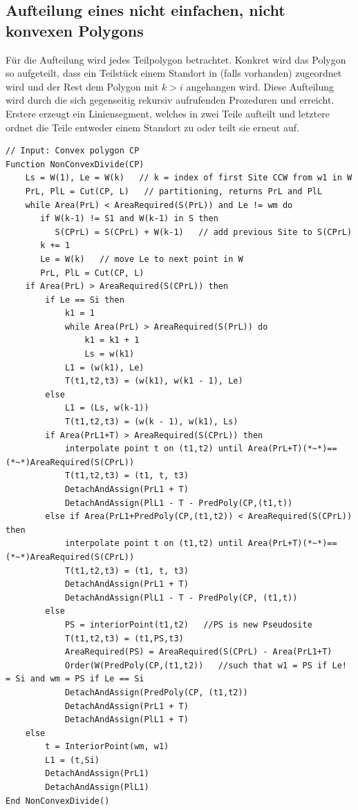 \documentclass[ngerman]{seminarbeitrag}
\begin{document}
\subsection{Aufteilung eines nicht einfachen, nicht konvexen Polygons}\label{aufteilung nicht konvex}
Für die Aufteilung wird jedes Teilpolygon \cpp betrachtet. Konkret wird das Polygon \pred{\mcpi}so aufgeteilt, dass ein Teilstück einem Standort in \cpi (falls vorhanden) zugeordnet wird und der Rest dem Polygon mit $k > i$ angehangen wird. Diese Aufteilung wird durch die sich gegenseitig rekursiv aufrufenden Prozeduren \noncon und \daa erreicht. Erstere erzeugt ein Liniensegment, welches \pred{\mcpi}in zwei Teile aufteilt und letztere ordnet die Teile entweder einem Standort zu oder teilt sie erneut auf.

\begin{lstlisting}[float,caption={Der Algorithmus \noncon}, frame=single, label=code nicht konvex]
// Input: Convex polygon CP
Function NonConvexDivide(CP)
    Ls = W(1), Le = W(k)   // k = index of first Site CCW from w1 in W
    PrL, PlL = Cut(CP, L)   // partitioning, returns PrL and PlL
    while Area(PrL) < AreaRequired(S(PrL)) and Le != wm do
       if W(k-1) != S1 and W(k-1) in S then 
          S(CPrL) = S(CPrL) + W(k-1)   // add previous Site to S(CPrL)
       k += 1
       Le = W(k)   // move Le to next point in W
       PrL, PlL = Cut(CP, L)
    if Area(PrL) > AreaRequired(S(CPrL)) then
        if Le == Si then
            k1 = 1
            while Area(PrL) > AreaRequired(S(PrL)) do
                k1 = k1 + 1
                Ls = w(k1)
            L1 = (w(k1), Le)
            T(t1,t2,t3) = (w(k1), w(k1 - 1), Le)
        else
            L1 = (Ls, w(k-1))
            T(t1,t2,t3) = (w(k - 1), w(k1), Ls)
        if Area(PrL1+T) > AreaRequired(S(CPrL)) then
            interpolate point t on (t1,t2) until Area(PrL+T)(*~*)==(*~*)AreaRequired(S(CPrL))
            T(t1,t2,t3) = (t1, t, t3)
            DetachAndAssign(PrL1 + T)
            DetachAndAssign(PlL1 - T - PredPoly(CP,(t1,t))
        else if Area(PrL1+PredPoly(CP,(t1,t2)) < AreaRequired(S(CPrL)) then
            interpolate point t on (t1,t2) until Area(PrL+T)(*~*)==(*~*)AreaRequired(S(CPrL))
            T(t1,t2,t3) = (t1, t, t3)
            DetachAndAssign(PrL1 + T)
            DetachAndAssign(PlL1 - T - PredPoly(CP, (t1,t))
        else
            PS = interiorPoint(t1,t2)   //PS is new Pseudosite
            T(t1,t2,t3) = (t1,PS,t3)
            AreaRequired(PS) = AreaRequired(S(CPrL) - Area(PrL1+T)
            Order(W(PredPoly(CP,(t1,t2))   //such that w1 = PS if Le! = Si and wm = PS if Le == Si
            DetachAndAssign(PredPoly(CP, (t1,t2))
            DetachAndAssign(PrL1 + T)
            DetachAndAssign(PlL1 + T)
    else
        t = InteriorPoint(wm, w1)
        L1 = (t,Si)
        DetachAndAssign(PrL1)
        DetachAndAssign(PlL1)
End NonConvexDivide() 

\end{lstlisting}
\end{document}

